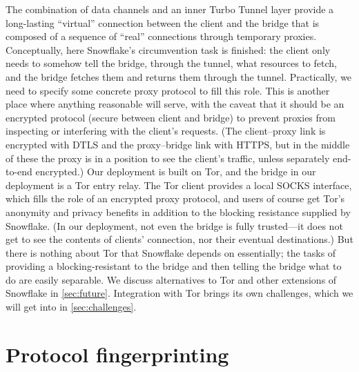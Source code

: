 \documentclass[letterpaper,twocolumn]{article}
\begin{document}
The combination of data channels and an inner Turbo Tunnel layer
provide a long-lasting ``virtual'' connection between the client and the bridge
that is composed of a sequence of ``real'' connections through temporary proxies.
Conceptually, here Snowflake's circumvention task is finished:
the client only needs to somehow tell the bridge, through the tunnel,
what resources to fetch, and the bridge fetches them and returns them through the tunnel.
Practically, we need to specify some concrete proxy protocol to fill this role.
This is another place where anything reasonable will serve,
with the caveat that it should be an encrypted protocol
(secure between client and bridge) to prevent proxies
from inspecting or interfering with the client's requests.
(The client--proxy link is encrypted with DTLS
and the proxy--bridge link with HTTPS,
but in the middle of these the proxy is in a position to see
the client's traffic, unless separately end-to-end encrypted.)
Our deployment is built on Tor,
and the bridge in our deployment is a Tor entry relay.
The Tor client provides a local SOCKS interface,
which fills the role of an encrypted proxy protocol,
and users of course get Tor's anonymity and privacy benefits
in addition to the blocking resistance supplied by Snowflake.
(In our deployment, not even the bridge is fully trusted---it
does not get to see the contents of clients' connection,
nor their eventual destinations.)
But there is nothing about Tor that Snowflake depends on essentially;
the tasks of providing a blocking-resistant to the bridge
and then telling the bridge what to do are easily separable.
We discuss alternatives to Tor
and other extensions of Snowflake in \autoref{sec:future}.
Integration with Tor brings its own challenges,
which we will get into in \autoref{sec:challenges}.

\section{Protocol fingerprinting}
\label{sec:fingerprinting}

\end{document}
